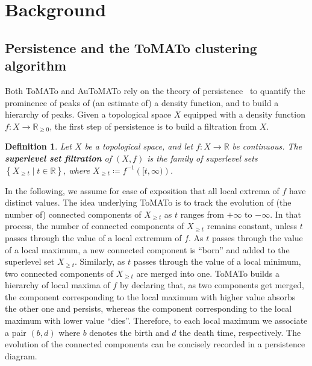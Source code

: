 \documentclass[10pt]{article} %
\theoremstyle{plain}
\newtheorem{definition}[theorem]{Definition}
\newcommand{\RR}{\mathbb{R}}
\newcommand{\aut}{AuToMATo\xspace}
\newcommand{\tom}{ToMATo\xspace}
\begin{document}

\section{Background}\label{sec:background}

\subsection {Persistence and the \tom clustering algorithm}\label{subsec:tomato}

Both \tom and \aut rely on the theory of persistence~\citep{Edelsbrunner2002, Zomorodian2005, carlsson2014} to quantify the prominence of peaks of (an estimate of) a density function, and to build a hierarchy of peaks. Given a topological space \(X\) equipped with a density function $f\colon X \to \RR_{\geq 0}$, the first step of persistence is to build a filtration from $X$.

\begin{definition}\label{def:suplevel_set_filtration}
Let $X$ be a topological space, and let $f\colon X \to \RR$ be continuous. The \textbf{superlevel set filtration} of $(X, f)$ is the family of superlevel sets \(\left\{X_{\geq t}\mid t\in\RR\right\}\), where \(X_{\geq t}\coloneqq f^{-1}\left([t, \infty)\right)\).
\end{definition}

In the following, we assume for ease of exposition that all local extrema of \(f\) have distinct values.
The idea underlying \tom is to track the evolution of (the number of) connected components of $X_{\geq t}$ as $t$ ranges from $+\infty$ to $-\infty$. In that process, the number of connected components of \(X_{\geq t}\) remains constant, unless \(t\) passes through the value of a local extremum of \(f\).
As \(t\) passes through the value of a local maximum, a new connected component is ``born'' and added to the superlevel set \(X_{\geq t}\).
Similarly, as \(t\) passes through the value of a local minimum, two connected components of \(X_{\geq t}\) are merged into one.
\tom builds a hierarchy of local maxima of \(f\) by declaring that, as two components get merged, the component corresponding to the local maximum with higher value absorbs the other one and persists, whereas the component corresponding to the local maximum with lower value ``dies''. Therefore, to each local maximum we associate a pair $(b,d)$ where $b$ denotes the birth and $d$ the death time, respectively.
The evolution of the connected components can be concisely recorded in a persistence diagram.
\end{document}
